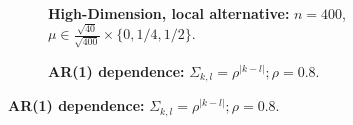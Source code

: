 \documentclass[12pt,a4paper]{article}
\newcommand{\set}[1]{\{ #1 \}} %
\newcommand{\mycaption}{Simulation details in Appendix~\ref{apx:simulation_details} except the changes in the sub-captions.}
\begin{document}
\begin{figure}[h]
\centering
\caption{\mycaption}	
	\begin{subfigure}{.5\textwidth}
	  \centering
	  \caption{\textbf{High-Dimension, local alternative:} $n=400$, $\mu \in \frac{\sqrt{40}}{\sqrt{400}} \times \set{0,1/4,1/2}.$} 
	\label{fig:large_sample_3}
	\end{subfigure}
		\begin{subfigure}{.5\textwidth}
		  \centering
		  \caption{\textbf{AR(1) dependence:} $\Sigma_{k,l}=\rho^{|k-l|}; \rho=0.8$. } 
		\label{fig:ar_1}
	\end{subfigure}
\end{figure}
\end{document}
